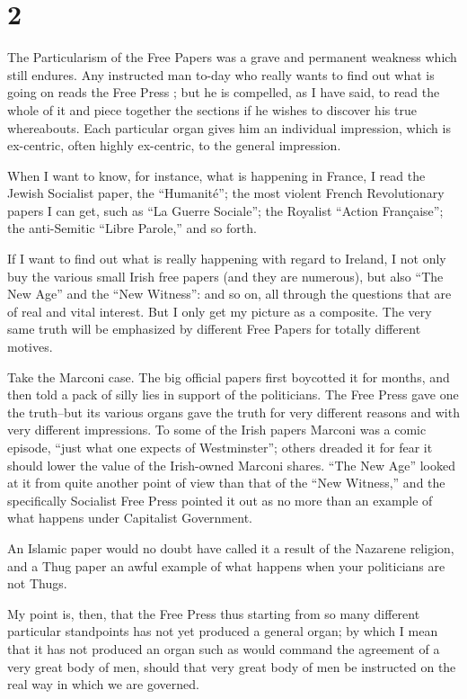 \documentclass{book}
\begin{document}
\section*{2}
The Particularism of the Free Papers was a grave and permanent weakness which still endures. Any instructed man to-day who really wants to find out what is going on reads the Free Press ; but he is compelled, as I have said, to read the whole of it and piece together the sections if he wishes to discover his true whereabouts. Each particular organ gives him an individual impression, which is ex-centric, often highly ex-centric, to the general impression.

When I want to know, for instance, what is happening in France, I read the Jewish Socialist paper, the “Humanité”; the most violent French Revolutionary papers I can get, such as “La Guerre Sociale”; the Royalist “Action Française”; the anti-Semitic “Libre Parole,” and so forth.

If I want to find out what is really happening with regard to Ireland, I not only buy the various small Irish free papers (and they are numerous), but also “The New Age” and the “New Witness”: and so on, all through the questions that are of real and vital interest. But I only get my picture as a composite. The very same truth will be emphasized by different Free Papers for totally different motives.

Take the Marconi case. The big official papers first boycotted it for months, and then told a pack of silly lies in support of the politicians. The Free Press gave one the truth–but its various organs gave the truth for very different reasons and with very different impressions. To some of the Irish papers Marconi was a comic episode, “just what one expects of Westminster”; others dreaded it for fear it should lower the value of the Irish-owned Marconi shares. “The New Age” looked at it from quite another point of view than that of the “New Witness,” and the specifically Socialist Free Press pointed it out as no more than an example of what happens under Capitalist Government.

An Islamic paper would no doubt have called it a result of the Nazarene religion, and a Thug paper an awful example of what happens when your politicians are not Thugs.

My point is, then, that the Free Press thus starting from so many different particular standpoints has not yet produced a general organ; by which I mean that it has not produced an organ such as would command the agreement of a very great body of men, should that very great body of men be instructed on the real way in which we are governed.
\end{document}
